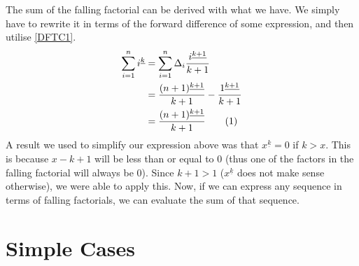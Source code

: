 \documentclass[a4paper]{article}
\theoremstyle{definition}
\begin{document}
The sum of the falling factorial can be derived with what we have.
We simply have to rewrite it in terms of the forward difference of some expression, and then utilise \eqref{DFTC1}.
\begin{align*}
    \sum_{i=1}^n i^{\underline{k}} & = \sum_{i=1}^n \Delta_i \frac{i^{\underline{k+1}}}{k+1}                        \\
                                   & = \frac{(n+1)^{\underline{k+1}}}{k+1} - \frac{{1}^{\underline{k+1}}}{k+1}      \\
                                   & = \frac{(n+1)^{\underline{k+1}}}{k+1} \stepcounter{equation}\tag{\theequation}
\end{align*}
A result we used to simplify our expression above was that $x^{\underline{k}} = 0$ if $k > x$.
This is because $x-k+1$ will be less than or equal to 0 (thus one of the factors in the falling factorial will always be 0).
Since $k +1 > 1$ ($x^{\underline{k}}$ does not make sense otherwise), we were able to apply this.
Now, if we can express any sequence in terms of falling factorials, we can evaluate the sum of that sequence.

\section{Simple Cases}
\end{document}
